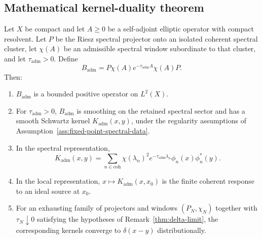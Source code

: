 \documentclass[11pt]{article}
\newcommand{\Kadm}{K_{\mathrm{adm}}}
\newcommand{\Badm}{B_{\mathrm{adm}}}
\newcommand{\ta}{\tau_{\mathrm{adm}}}
\newcommand{\coh}{\mathrm{coh}}
\begin{document}
\subsection{Mathematical kernel-duality theorem}
\label{subsec:kernel-duality-theorem}

\begin{theorem}
\label{thm:kernel-dual-representation}
Let \(X\) be compact and let \(A\ge0\) be a self-adjoint elliptic operator with compact
resolvent. Let \(P\) be the Riesz spectral projector onto an isolated coherent spectral
cluster, let \(\chi(A)\) be an admissible spectral window subordinate to that cluster, and let
\(\ta>0\). Define
\begin{equation}
  \Badm
  =
  P\chi(A)e^{-\ta A}\chi(A)P.
  \label{eq:theorem-badm}
\end{equation}
Then:
\begin{enumerate}[label=(\roman*)]
  \item \(\Badm\) is a bounded positive operator on \(L^2(X)\).
  \item For \(\ta>0\), \(\Badm\) is smoothing on the retained spectral sector and has a smooth
 Schwartz kernel \(\Kadm(x,y)\), under the regularity assumptions of
Assumption~\ref{ass:fixed-point-spectral-data}.
  \item In the spectral representation,
  \begin{equation}
    \Kadm(x,y)
    =
    \sum_{n\in\coh}
    \chi(\lambda_n)^2 e^{-\ta\lambda_n}
    \phi_n(x)\phi_n^\ast(y).
    \label{eq:theorem-spectral-kernel}
  \end{equation}
  \item In the local representation, \(x\mapsto \Kadm(x,x_0)\) is the finite coherent
  response to an ideal source at \(x_0\).
  \item For an exhausting family of projectors and windows
  \((P_N,\chi_N)\) together with \(\tau_N\downarrow0\) satisfying the hypotheses of
  Remark~\ref{thm:delta-limit}, the corresponding kernels converge to
  \(\delta(x-y)\) distributionally.
\end{enumerate}
\end{theorem}
\end{document}
